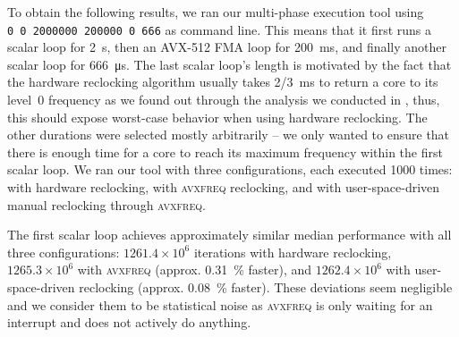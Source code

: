 To obtain the following results, we ran our multi-phase execution tool using \texttt{0~0~2000000~200000~0~666} as command line. This means that it first runs a scalar loop for \SI{2}{\second}, then an \gls{AVX-512} \gls{FMA} loop for \SI{200}{\milli\second}, and finally another scalar loop for \SI{666}{\micro\second}. The last scalar loop's length is motivated by the fact that the hardware reclocking algorithm usually takes \SI[quotient-mode=fraction]{2/3}{\milli\second} to return a core to its level~0 frequency as we found out through the analysis we conducted in , thus, this should expose worst-case behavior when using hardware reclocking. The other durations were selected mostly arbitrarily -- we only wanted to ensure that there is enough time for a core to reach its maximum frequency within the first scalar loop. We ran our tool with three configurations, each executed 1000 times: with hardware reclocking, with \textsc{avxfreq} reclocking, and with user-space-driven manual reclocking through \textsc{avxfreq}.

The first scalar loop achieves approximately similar median performance with all three configurations: $1261.4\times10^6$ iterations with hardware reclocking, $1265.3\times10^6$ with \textsc{avxfreq} (approx. \SI{0.31}{\percent} faster), and $1262.4\times10^6$ with user-space-driven reclocking (approx. \SI{0.08}{\percent} faster). These deviations seem negligible and we consider them to be statistical noise as \textsc{avxfreq} is only waiting for an interrupt and does not actively do anything.


